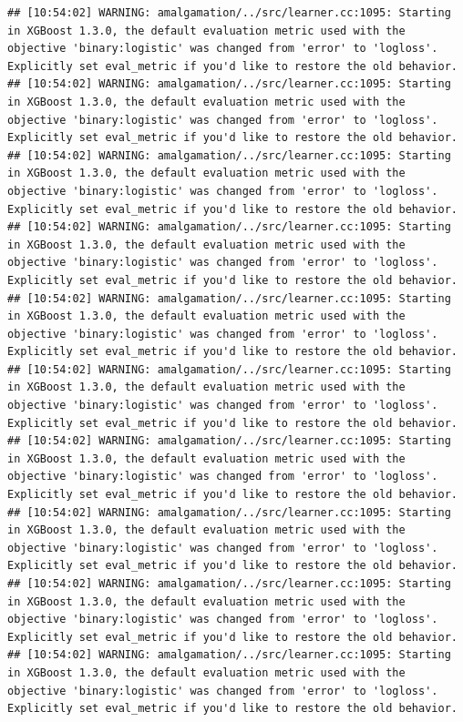 \documentclass[
]{scrbook}
\begin{document}
\begin{verbatim}
## [10:54:02] WARNING: amalgamation/../src/learner.cc:1095: Starting in XGBoost 1.3.0, the default evaluation metric used with the objective 'binary:logistic' was changed from 'error' to 'logloss'. Explicitly set eval_metric if you'd like to restore the old behavior.
## [10:54:02] WARNING: amalgamation/../src/learner.cc:1095: Starting in XGBoost 1.3.0, the default evaluation metric used with the objective 'binary:logistic' was changed from 'error' to 'logloss'. Explicitly set eval_metric if you'd like to restore the old behavior.
## [10:54:02] WARNING: amalgamation/../src/learner.cc:1095: Starting in XGBoost 1.3.0, the default evaluation metric used with the objective 'binary:logistic' was changed from 'error' to 'logloss'. Explicitly set eval_metric if you'd like to restore the old behavior.
## [10:54:02] WARNING: amalgamation/../src/learner.cc:1095: Starting in XGBoost 1.3.0, the default evaluation metric used with the objective 'binary:logistic' was changed from 'error' to 'logloss'. Explicitly set eval_metric if you'd like to restore the old behavior.
## [10:54:02] WARNING: amalgamation/../src/learner.cc:1095: Starting in XGBoost 1.3.0, the default evaluation metric used with the objective 'binary:logistic' was changed from 'error' to 'logloss'. Explicitly set eval_metric if you'd like to restore the old behavior.
## [10:54:02] WARNING: amalgamation/../src/learner.cc:1095: Starting in XGBoost 1.3.0, the default evaluation metric used with the objective 'binary:logistic' was changed from 'error' to 'logloss'. Explicitly set eval_metric if you'd like to restore the old behavior.
## [10:54:02] WARNING: amalgamation/../src/learner.cc:1095: Starting in XGBoost 1.3.0, the default evaluation metric used with the objective 'binary:logistic' was changed from 'error' to 'logloss'. Explicitly set eval_metric if you'd like to restore the old behavior.
## [10:54:02] WARNING: amalgamation/../src/learner.cc:1095: Starting in XGBoost 1.3.0, the default evaluation metric used with the objective 'binary:logistic' was changed from 'error' to 'logloss'. Explicitly set eval_metric if you'd like to restore the old behavior.
## [10:54:02] WARNING: amalgamation/../src/learner.cc:1095: Starting in XGBoost 1.3.0, the default evaluation metric used with the objective 'binary:logistic' was changed from 'error' to 'logloss'. Explicitly set eval_metric if you'd like to restore the old behavior.
## [10:54:02] WARNING: amalgamation/../src/learner.cc:1095: Starting in XGBoost 1.3.0, the default evaluation metric used with the objective 'binary:logistic' was changed from 'error' to 'logloss'. Explicitly set eval_metric if you'd like to restore the old behavior.

\end{verbatim}
\end{document}
